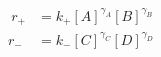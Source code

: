 \begin{eqnarray}\
r_+  & =  k_+[A]^{\gamma_A}[B]^{\gamma_B} \\
r_-  & =  k_-[C]^{\gamma_C}[D]^{\gamma_D} \\
\end{eqnarray}